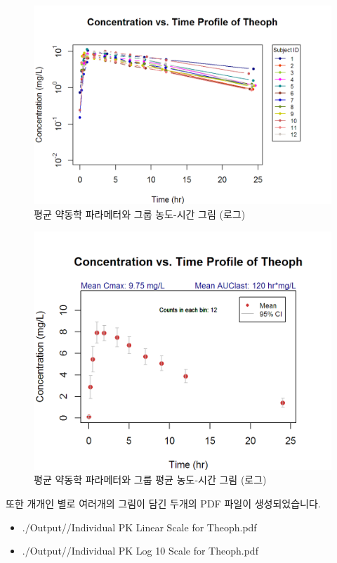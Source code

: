 \documentclass[12pt,]{krantz}
\providecommand{\tightlist}{%
  \setlength{\itemsep}{0pt}\setlength{\parskip}{0pt}}
\theoremstyle{definition}
\theoremstyle{definition}
\theoremstyle{definition}
\theoremstyle{remark}
\begin{document}
\begin{figure}
\includegraphics[width=16.67in]{Output/PK_Profile_Log_10_Scale_for_Theoph} \caption{평균 약동학 파라메터와 그룹 농도-시간 그림 (로그)}\label{fig:unnamed-chunk-26}
\end{figure}

\begin{figure}
\includegraphics[width=13.89in]{Output/PK_Profile_with_CI_for_Theoph} \caption{평균 약동학 파라메터와 그룹 평균 농도-시간 그림 (로그)}\label{fig:unnamed-chunk-27}
\end{figure}

또한 개개인 별로 여러개의 그림이 담긴 두개의 PDF 파일이 생성되었습니다.

\begin{itemize}
\tightlist
\item
  ./Output//Individual PK Linear Scale for Theoph.pdf
\item
  ./Output//Individual PK Log 10 Scale for Theoph.pdf
\end{itemize}
\end{document}
